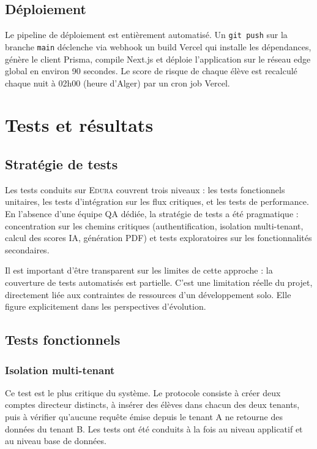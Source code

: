 \documentclass[12pt,a4paper,oneside]{report}
\newcommand{\edura}{\textsc{Edura}}
\begin{document}
\section{Déploiement}

Le pipeline de déploiement est entièrement automatisé. Un \texttt{git push} sur la branche \texttt{main} déclenche via webhook un build Vercel qui installe les dépendances, génère le client Prisma, compile Next.js et déploie l'application sur le réseau edge global en environ 90 secondes. Le score de risque de chaque élève est recalculé chaque nuit à 02h00 (heure d'Alger) par un cron job Vercel.

\chapter{Tests et résultats}

\section{Stratégie de tests}

Les tests conduits sur \edura{} couvrent trois niveaux : les tests fonctionnels unitaires, les tests d'intégration sur les flux critiques, et les tests de performance. En l'absence d'une équipe QA dédiée, la stratégie de tests a été pragmatique : concentration sur les chemins critiques (authentification, isolation multi-tenant, calcul des scores IA, génération PDF) et tests exploratoires sur les fonctionnalités secondaires.

Il est important d'être transparent sur les limites de cette approche : la couverture de tests automatisés est partielle. C'est une limitation réelle du projet, directement liée aux contraintes de ressources d'un développement solo. Elle figure explicitement dans les perspectives d'évolution.

\section{Tests fonctionnels}

\subsection{Isolation multi-tenant}

Ce test est le plus critique du système. Le protocole consiste à créer deux comptes directeur distincts, à insérer des élèves dans chacun des deux tenants, puis à vérifier qu'aucune requête émise depuis le tenant A ne retourne des données du tenant B. Les tests ont été conduits à la fois au niveau applicatif et au niveau base de données.
\end{document}
